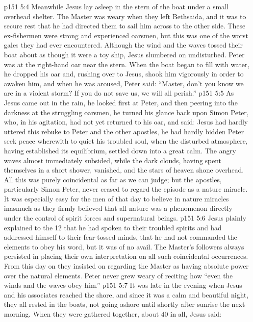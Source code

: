 \vs p151 5:4 Meanwhile Jesus lay asleep in the stern of the boat under a small overhead shelter. The Master was weary when they left Bethsaida, and it was to secure rest that he had directed them to sail him across to the other side. These ex\hyp{}fishermen were strong and experienced oarsmen, but this was one of the worst gales they had ever encountered. Although the wind and the waves tossed their boat about as though it were a toy ship, Jesus slumbered on undisturbed. Peter was at the right\hyp{}hand oar near the stern. When the boat began to fill with water, he dropped his oar and, rushing over to Jesus, shook him vigorously in order to awaken him, and when he was aroused, Peter said: “Master, don’t you know we are in a violent storm? If you do not save us, we will all perish.”
\vs p151 5:5 As Jesus came out in the rain, he looked first at Peter, and then peering into the darkness at the struggling oarsmen, he turned his glance back upon Simon Peter, who, in his agitation, had not yet returned to his oar, and said:  Jesus had hardly uttered this rebuke to Peter and the other apostles, he had hardly bidden Peter seek peace wherewith to quiet his troubled soul, when the disturbed atmosphere, having established its equilibrium, settled down into a great calm. The angry waves almost immediately subsided, while the dark clouds, having spent themselves in a short shower, vanished, and the stars of heaven shone overhead. All this was purely coincidental as far as we can judge; but the apostles, particularly Simon Peter, never ceased to regard the episode as a nature miracle. It was especially easy for the men of that day to believe in nature miracles inasmuch as they firmly believed that all nature was a phenomenon directly under the control of spirit forces and supernatural beings.
\vs p151 5:6 Jesus plainly explained to the 12 that he had spoken to their troubled spirits and had addressed himself to their fear\hyp{}tossed minds, that he had not commanded the elements to obey his word, but it was of no avail. The Master’s followers always persisted in placing their own interpretation on all such coincidental occurrences. From this day on they insisted on regarding the Master as having absolute power over the natural elements. Peter never grew weary of reciting how “even the winds and the waves obey him.”
\vs p151 5:7 It was late in the evening when Jesus and his associates reached the shore, and since it was a calm and beautiful night, they all rested in the boats, not going ashore until shortly after sunrise the next morning. When they were gathered together, about 40 in all, Jesus said: 
